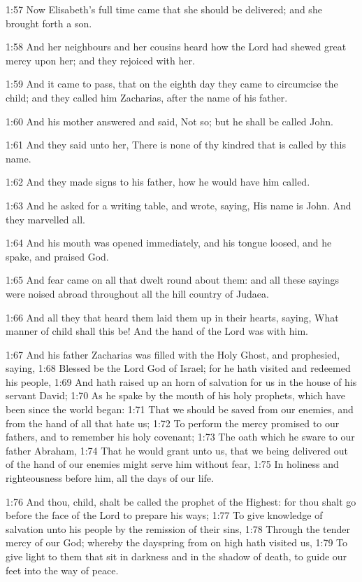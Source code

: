 1:57 Now Elisabeth's full time came that she should be delivered; and she brought forth a son.

1:58 And her neighbours and her cousins heard how the Lord had shewed great mercy upon her; and they rejoiced with her.

1:59 And it came to pass, that on the eighth day they came to circumcise the child; and they called him Zacharias, after the name of his father.

1:60 And his mother answered and said, Not so; but he shall be called John.

1:61 And they said unto her, There is none of thy kindred that is called by this name.

1:62 And they made signs to his father, how he would have him called.

1:63 And he asked for a writing table, and wrote, saying, His name is John. And they marvelled all.

1:64 And his mouth was opened immediately, and his tongue loosed, and he spake, and praised God.

1:65 And fear came on all that dwelt round about them: and all these sayings were noised abroad throughout all the hill country of Judaea.

1:66 And all they that heard them laid them up in their hearts, saying, What manner of child shall this be! And the hand of the Lord was with him.

1:67 And his father Zacharias was filled with the Holy Ghost, and prophesied, saying, 1:68 Blessed be the Lord God of Israel; for he hath visited and redeemed his people, 1:69 And hath raised up an horn of salvation for us in the house of his servant David; 1:70 As he spake by the mouth of his holy prophets, which have been since the world began: 1:71 That we should be saved from our enemies, and from the hand of all that hate us; 1:72 To perform the mercy promised to our fathers, and to remember his holy covenant; 1:73 The oath which he sware to our father Abraham, 1:74 That he would grant unto us, that we being delivered out of the hand of our enemies might serve him without fear, 1:75 In holiness and righteousness before him, all the days of our life.

1:76 And thou, child, shalt be called the prophet of the Highest: for thou shalt go before the face of the Lord to prepare his ways; 1:77 To give knowledge of salvation unto his people by the remission of their sins, 1:78 Through the tender mercy of our God; whereby the dayspring from on high hath visited us, 1:79 To give light to them that sit in darkness and in the shadow of death, to guide our feet into the way of peace.

